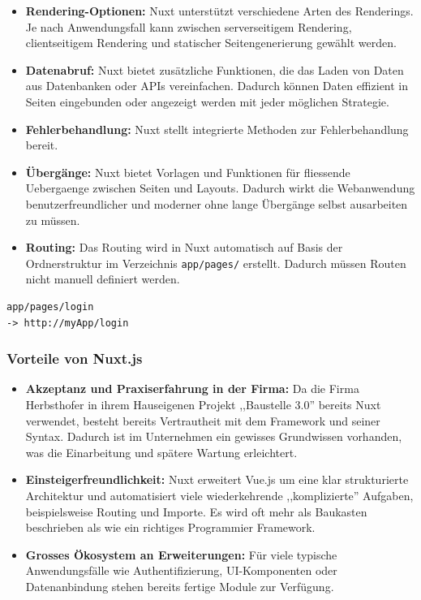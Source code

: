 \begin{itemize}
    \item \textbf{Rendering-Optionen:} Nuxt unterstützt verschiedene Arten des Renderings. Je nach Anwendungsfall kann zwischen serverseitigem Rendering, clientseitigem Rendering und statischer Seitengenerierung gewählt werden.
        
    \item \textbf{Datenabruf:} Nuxt bietet zusätzliche Funktionen, die das Laden von Daten aus Datenbanken oder APIs vereinfachen. Dadurch können Daten effizient in Seiten eingebunden oder angezeigt werden mit jeder möglichen Strategie.
    
    \item \textbf{Fehlerbehandlung:} Nuxt stellt integrierte Methoden zur Fehlerbehandlung bereit.
    
    \item \textbf{Übergänge:} Nuxt bietet Vorlagen und Funktionen für fliessende Uebergaenge zwischen Seiten und Layouts. Dadurch wirkt die Webanwendung benutzerfreundlicher und moderner ohne lange Übergänge selbst ausarbeiten zu müssen.
    
    \item \textbf{Routing:} Das Routing wird in Nuxt automatisch auf Basis der Ordnerstruktur im Verzeichnis \texttt{app/pages/} erstellt. Dadurch müssen Routen nicht manuell definiert werden.

\end{itemize}

\begin{lstlisting}[caption={Automatische Route in Nuxt.js}]
app/pages/login
-> http://myApp/login
\end{lstlisting}

\subsubsection{Vorteile von Nuxt.js}

\begin{itemize}
    \item \textbf{Akzeptanz und Praxiserfahrung in der Firma:} Da die Firma Herbsthofer in ihrem Hauseigenen Projekt ,,Baustelle 3.0'' bereits Nuxt verwendet, besteht bereits Vertrautheit mit dem Framework und seiner Syntax. Dadurch ist im Unternehmen ein gewisses Grundwissen vorhanden, was die Einarbeitung und spätere Wartung erleichtert.
    
    \item \textbf{Einsteigerfreundlichkeit:} Nuxt erweitert Vue.js um eine klar strukturierte Architektur und automatisiert viele wiederkehrende ,,komplizierte'' Aufgaben, beispielsweise Routing und Importe. Es wird oft mehr als Baukasten beschrieben als wie ein richtiges Programmier Framework.
    
    \item \textbf{Grosses Ökosystem an Erweiterungen:} Für viele typische Anwendungsfälle wie Authentifizierung, UI-Komponenten oder Datenanbindung stehen bereits fertige Module zur Verfügung. 

\end{itemize}

